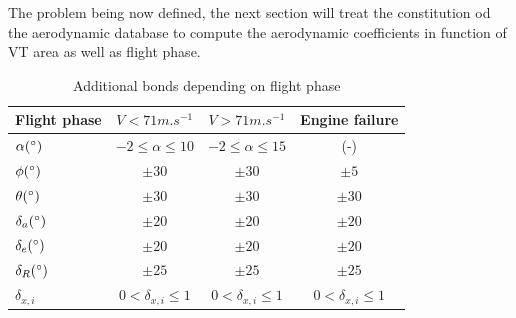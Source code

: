 The problem being now defined, the next section will treat the constitution od the aerodynamic database to compute the aerodynamic coefficients in function of VT area as well as flight phase.

\begin{table}[hbt!]
	\caption{\label{tab:Bonds} Additional bonds depending on flight phase}
	\centering
	\begin{tabular}{l|c|c|c}
		Flight phase & $V<71 m.s^{-1}$& $V>71 m.s^{-1}$ & Engine failure\\
		\hline
		$\alpha (\degree)$ & $-2\leq\alpha\leq 10$ & $-2\leq\alpha\leq 15$ & (-) \\
		$\phi (\degree)$ & $\pm 30$ & $\pm 30$ & $\pm 5$\\ 
		$\theta (\degree)$ & $\pm 30$ & $\pm 30$& $\pm 30$\\
		$\delta_a(\degree)$ & $\pm 20$& $\pm 20$& $\pm 20$\\
		$\delta_e(\degree)$ & $\pm 20$ & $\pm 20$ & $\pm 20$\\
		$\delta_R(\degree)$ & $\pm 25$ & $\pm 25$ & $\pm 25$\\
		$\delta_{x,i}$ & $0< \delta_{x,i} \leq 1$ & $0< \delta_{x,i} \leq 1$ & $0< \delta_{x,i} \leq 1$ \\
	\end{tabular}
\end{table}

